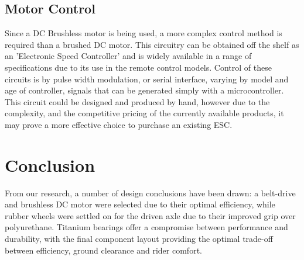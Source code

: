 \documentclass[journal,10pt]{IEEEtran}
\begin{document}
    \subsection{Motor Control}
    		Since a DC Brushless motor is being used, a more complex control method is required than a brushed DC motor.
    		This circuitry can be obtained off the shelf as an 'Electronic Speed Controller' and is widely available in a range of specifications due to its use in the remote control models.
    		Control of these circuits is by pulse width modulation, or serial interface, varying by model and age of controller, signals that can be generated simply with a microcontroller.
    		This circuit could be designed and produced by hand, however due to the complexity, and the competitive pricing of the currently available products, it may prove a more effective choice to purchase an existing ESC.
\section{Conclusion}
From our research, a number of design conclusions have been drawn: a belt-drive and brushless DC motor were selected due to their optimal efficiency, while rubber wheels were settled on for the driven axle due to their improved grip over polyurethane. Titanium bearings offer a compromise between performance and durability, with the final component layout providing the optimal trade-off between efficiency, ground clearance and rider comfort.



\end{document}
